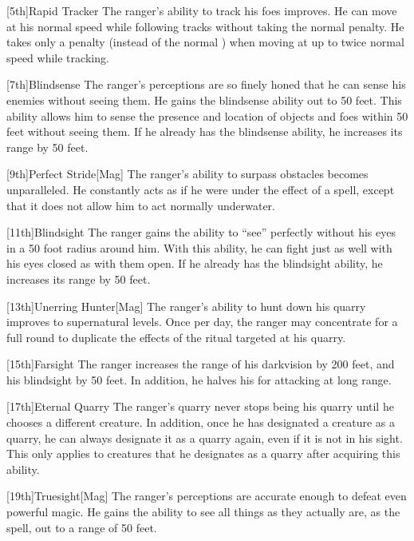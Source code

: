         [5th]{Rapid Tracker}
        The ranger's ability to track his foes improves.
        He can move at his normal speed while following tracks without taking the normal  penalty.
        He takes only a  penalty (instead of the normal ) when moving at up to twice normal speed while tracking.

        [7th]{Blindsense}
        The ranger's perceptions are so finely honed that he can sense his enemies without seeing them.
        He gains the blindsense ability out to 50 feet.
        This ability allows him to sense the presence and location of objects and foes within 50 feet without seeing them.
        If he already has the blindsense ability, he increases its range by 50 feet.

        [9th]{Perfect Stride}[Mag]
        The ranger's ability to surpass obstacles becomes unparalleled.
        He constantly acts as if he were under the effect of a  spell, except that it does not allow him to act normally underwater.

        [11th]{Blindsight}
        The ranger gains the ability to ``see'' perfectly without his eyes in a 50 foot radius around him.
        With this ability, he can fight just as well with his eyes closed as with them open.
        If he already has the blindsight ability, he increases its range by 50 feet.

        [13th]{Unerring Hunter}[Mag]
        The ranger's ability to hunt down his quarry improves to supernatural levels.
        Once per day, the ranger may concentrate for a full round to duplicate the effects of the  ritual targeted at his quarry.

        [15th]{Farsight}
        The ranger increases the range of his darkvision by 200 feet, and his blindsight by 50 feet.
        In addition, he halves his  for attacking at long range.

        [17th]{Eternal Quarry}
        The ranger's quarry never stops being his quarry until he chooses a different creature.
        In addition, once he has designated a creature as a quarry, he can always designate it as a quarry again, even if it is not in his sight.
        This only applies to creatures that he designates as a quarry after acquiring this ability.

        [19th]{Truesight}[Mag]
        The ranger's perceptions are accurate enough to defeat even powerful magic.
        He gains the ability to see all things as they actually are, as the  spell, out to a range of 50 feet.

